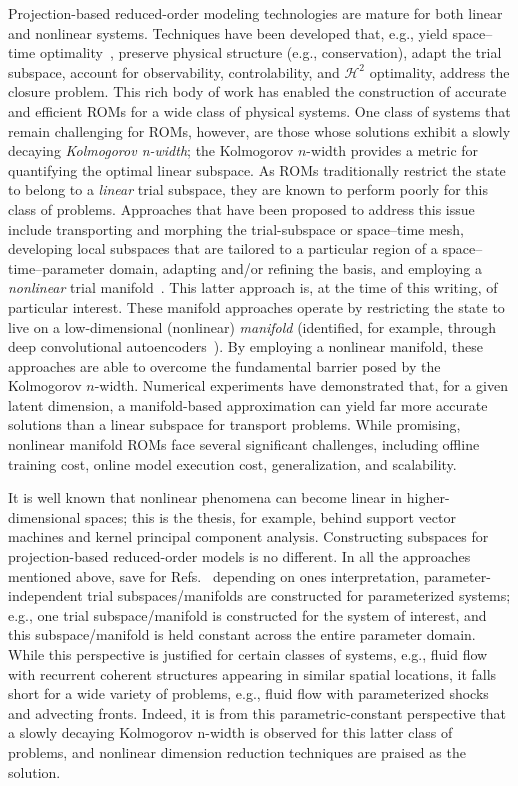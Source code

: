 \documentclass[3p,computermodern,10pt]{elsarticle}
\begin{document}
Projection-based reduced-order modeling technologies are mature for both linear and nonlinear systems. Techniques have been developed that, e.g., yield space--time optimality~\cite{choi_stlspg,constantine_strom,yuki_stlspg,parish_wls,townePOD}, preserve physical structure (e.g., conservation), adapt the trial subspace, account for observability, controlability, and $\mathcal{H}^2$ optimality, address the closure problem. This rich body of work has enabled the construction of accurate and efficient ROMs for a wide class of physical systems. One class of systems that remain challenging for ROMs, however, are those whose solutions exhibit a slowly decaying \textit{Kolmogorov n-width}; the Kolmogorov $n$-width provides a metric for quantifying the optimal linear subspace. As ROMs traditionally restrict the state to belong to a \textit{linear} trial subspace, they are known to perform poorly for this class of problems. Approaches that have been proposed to address this issue include transporting and morphing the trial-subspace or space--time mesh, developing local subspaces that are tailored to a particular region of a space--time--parameter domain, adapting and/or refining the basis, and employing a \textit{nonlinear} trial manifold~\cite{LeeCarlberg,kim2020fast}. This latter approach is, at the time of this writing, of particular interest. These manifold approaches operate by restricting the state to live on a low-dimensional (nonlinear) \textit{manifold} (identified, for example, through deep convolutional autoencoders~\cite{LeeCarlberg}). By employing a nonlinear manifold, these approaches are able to overcome the fundamental barrier posed by the Kolmogorov $n$-width. Numerical experiments have demonstrated that, for a given latent dimension, a manifold-based approximation can yield far more accurate solutions than a linear subspace for transport problems. While promising, nonlinear manifold ROMs face several significant challenges, including offline training cost, online model execution cost, generalization, and scalability. 

It is well known that nonlinear phenomena can become linear in higher-dimensional spaces; this is the thesis, for example, behind support vector machines and kernel principal component analysis. Constructing subspaces for projection-based reduced-order models is no different. In all the approaches mentioned above, save for Refs.~\cite{} depending on ones interpretation, parameter-independent trial subspaces/manifolds are constructed for parameterized systems; e.g., one trial subspace/manifold is constructed for the system of interest, and this subspace/manifold is held constant across the entire parameter domain. While this perspective is justified for certain classes of systems, e.g., fluid flow with recurrent coherent structures appearing in similar spatial locations, it falls short for a wide variety of problems, e.g., fluid flow with parameterized shocks and advecting fronts.  Indeed, it is from this parametric-constant perspective that a slowly decaying Kolmogorov n-width is observed for this latter class of problems, and nonlinear dimension reduction techniques are praised as the solution.
\end{document}
